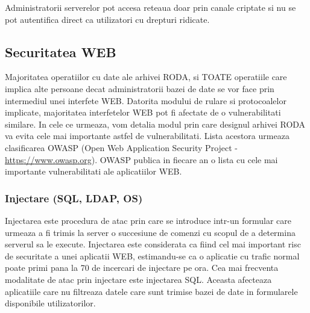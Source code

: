 \bigskip

{\sffamily\color{black}
Administratorii serverelor pot accesa reteaua doar prin canale criptate si nu se pot autentifica direct ca utilizatori
cu drepturi ridicate. }

\subsection{Securitatea WEB}


\bigskip

{\sffamily\color{black}
Majoritatea operatiilor cu date ale arhivei RODA, si TOATE operatiile care implica alte persoane decat administratorii
bazei de date se vor face prin intermediul unei interfete WEB. Datorita modului de rulare si protocoalelor implicate,
majoritatea interfetelor WEB pot fi afectate de o vulnerabilitati similare. In cele ce urmeaza, vom detalia modul prin
care designul arhivei RODA va evita cele mai importante astfel de vulnerabilitati. Lista acestora urmeaza clasificarea
OWASP (Open Web Application Security Project -
\href{https://www.owasp.org/}{\textcolor[rgb]{0.06666667,0.33333334,0.8}{https}}\href{https://www.owasp.org/}{\textcolor[rgb]{0.06666667,0.33333334,0.8}{://}}\href{https://www.owasp.org/}{\textcolor[rgb]{0.06666667,0.33333334,0.8}{www}}\href{https://www.owasp.org/}{\textcolor[rgb]{0.06666667,0.33333334,0.8}{.}}\href{https://www.owasp.org/}{\textcolor[rgb]{0.06666667,0.33333334,0.8}{owasp}}\href{https://www.owasp.org/}{\textcolor[rgb]{0.06666667,0.33333334,0.8}{.}}\href{https://www.owasp.org/}{\textcolor[rgb]{0.06666667,0.33333334,0.8}{org}}).
OWASP publica in fiecare an o lista cu cele mai importante vulnerabilitati ale aplicatiilor WEB. }


\bigskip

\subsubsection{Injectare (SQL, LDAP, OS) }


\bigskip

{\sffamily\color{black}
Injectarea este procedura de atac prin care se introduce intr-un formular care urmeaza a fi trimis la server o
succesiune de comenzi cu scopul de a determina serverul sa le execute. Injectarea este considerata ca fiind cel mai
important risc de securitate a unei aplicatii WEB, estimandu-se ca o aplicatie cu trafic normal poate primi pana la 70
de incercari de injectare pe ora. Cea mai frecventa modalitate de atac prin injectare este injectarea SQL. Aceasta
afecteaza aplicatiile care nu filtreaza datele care sunt trimise bazei de date in formularele disponibile
utilizatorilor. }


